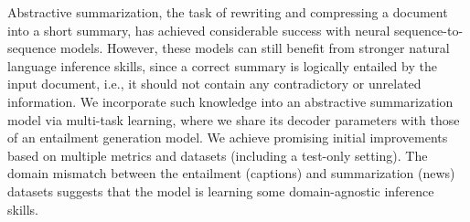 Abstractive summarization, the task of rewriting and compressing a document into a short summary, has achieved considerable success with neural sequence-to-sequence models. However, these models can still benefit from stronger natural language inference skills, since a correct summary is logically entailed by the input document, i.e., it should not contain any contradictory or unrelated information. We incorporate such knowledge into an abstractive summarization model via multi-task learning, where we share its decoder parameters with those of an entailment generation model. We achieve promising initial improvements based on multiple metrics and datasets (including a test-only setting). The domain mismatch between the entailment (captions) and summarization (news) datasets suggests that the model is learning some domain-agnostic inference skills.
